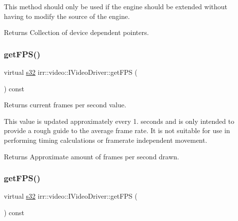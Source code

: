 This method should only be used if the engine should be extended without having to modify the source of the engine. \begin{DoxyReturn}{Returns}
Collection of device dependent pointers. 
\end{DoxyReturn}
\mbox{\label{classirr_1_1video_1_1IVideoDriver_a5b71428402c0b6a3b18b8f2fa408af13}} 
\subsubsection{\texorpdfstring{get\+F\+P\+S()}{getFPS()}\hspace{0.1cm}{\footnotesize\ttfamily [1/2]}}
{\footnotesize\ttfamily virtual \hyperlink{namespaceirr_ac66849b7a6ed16e30ebede579f9b47c6}{s32} irr\+::video\+::\+I\+Video\+Driver\+::get\+F\+PS (\begin{DoxyParamCaption}{ }\end{DoxyParamCaption}) const\hspace{0.3cm}{\ttfamily [pure virtual]}}



Returns current frames per second value. 

This value is updated approximately every 1. seconds and is only intended to provide a rough guide to the average frame rate. It is not suitable for use in performing timing calculations or framerate independent movement. \begin{DoxyReturn}{Returns}
Approximate amount of frames per second drawn. 
\end{DoxyReturn}
\mbox{\label{classirr_1_1video_1_1IVideoDriver_a5b71428402c0b6a3b18b8f2fa408af13}} 
\subsubsection{\texorpdfstring{get\+F\+P\+S()}{getFPS()}\hspace{0.1cm}{\footnotesize\ttfamily [2/2]}}
{\footnotesize\ttfamily virtual \hyperlink{namespaceirr_ac66849b7a6ed16e30ebede579f9b47c6}{s32} irr\+::video\+::\+I\+Video\+Driver\+::get\+F\+PS (\begin{DoxyParamCaption}{ }\end{DoxyParamCaption}) const\hspace{0.3cm}{\ttfamily [pure virtual]}}




